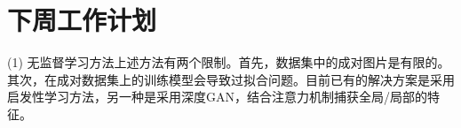 \documentclass[letterpaper,12pt]{article}
\begin{document}
%			
%		
%		
%					
%			
%			
%		
%			
%			
	
	
	\section{下周工作计划}
	
	(1) 无监督学习方法上述方法有两个限制。首先，数据集中的成对图片是有限的。其次，在成对数据集上的训练模型会导致过拟合问题。目前已有的解决方案是采用启发性学习方法，另一种是采用深度GAN，结合注意力机制捕获全局/局部的特征。
	
\end{document}
